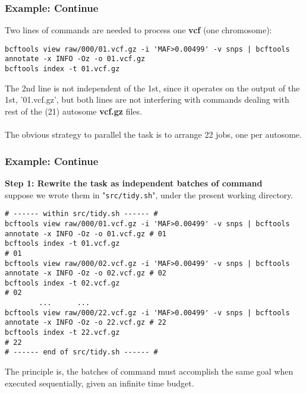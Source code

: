 \documentclass{beamer}
\begin{document}

\begin{frame}[fragile]
\frametitle{Example: Continue}
Two lines of commands are needed to process one \textbf{vcf} (one chromosome):
\begin{example}
\tiny
\begin{verbatim}
bcftools view raw/000/01.vcf.gz -i 'MAF>0.00499' -v snps | bcftools annotate -x INFO -Oz -o 01.vcf.gz
bcftools index -t 01.vcf.gz
\end{verbatim}
\end{example}
The 2nd line is not independent of the 1st, since it operates on the output of the 1st, '01.vcf.gz', but both
lines are not interfering with commands dealing with rest of the (21) autosome \textbf{vcf.gz} files.
\\~\\
The obvious strategy to parallel the task is to arrange 22 jobs, one per autosome.
\end{frame}


\begin{frame}[fragile]
\frametitle{Example: Continue}
\textbf{Step 1: Rewrite the task as independent batches of command} \\
suppose we wrote them in "\verb|src/tidy.sh|", under the present working directory.
\begin{example}
\tiny \begin{verbatim}
# ------ within src/tidy.sh ------ #
bcftools view raw/000/01.vcf.gz -i 'MAF>0.00499' -v snps | bcftools annotate -x INFO -Oz -o 01.vcf.gz # 01
bcftools index -t 01.vcf.gz                                                                           # 01
bcftools view raw/000/02.vcf.gz -i 'MAF>0.00499' -v snps | bcftools annotate -x INFO -Oz -o 02.vcf.gz # 02
bcftools index -t 02.vcf.gz                                                                           # 02
        ...      ...
bcftools view raw/000/22.vcf.gz -i 'MAF>0.00499' -v snps | bcftools annotate -x INFO -Oz -o 22.vcf.gz # 22
bcftools index -t 22.vcf.gz                                                                           # 22
# ------ end of src/tidy.sh ------ #
\end{verbatim}
\end{example}
The principle is, the batches of command must accomplish the same goal when executed sequentially, given an
infinite time budget.
\end{frame}
\end{document}
